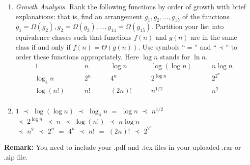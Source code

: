 \documentclass[12pt,a4paper]{article}
\makeatletter
\newtheorem*{solution}{Solution}
\theoremstyle{definition}
\renewenvironment{solution}[1][Solution] {\par\pushQED{\qed}\normalfont\topsep6\p@\@plus6\p@\relax\trivlist\item[\hskip\labelsep\bfseries#1\@addpunct{.}]\ignorespaces}{\popQED\endtrivlist\@endpefalse} \makeatother
\makeatother
\begin{document}
\begin{enumerate}
\item \textit{Growth Analysis.} Rank the following functions by order of growth with brief explanations: that is, find an arrangement $g_1, g_2, \ldots , g_{15}$ of the functions $g_1 = \Omega(g_2), g_2 = \Omega(g_3), \ldots, g_{14} = \Omega(g_{15})$.  Partition your list into equivalence classes such that functions $f(n)$ and $g(n)$ are in the same class if and only if $f(n) = \Theta(g(n))$. Use symbols ``$=$'' and ``$\prec$'' to order these functions appropriately. Here $\log n$ stands for $\ln n$.
$$
\begin{array}{ccccc}
	1 \quad & \quad n \quad & \quad \log n \quad & \quad \log (\log n) \quad & \quad n \log n \\
	\log_4 n \quad & \quad 2^n \quad & \quad 4^n \quad & \quad 2^{\log n} \quad & \quad 2^{2^n} \\
	\log (n!) \quad & \quad n! \quad & \quad (2n)! \quad & \quad  n^{1/2} \quad & \quad n^2 \\
\end{array}
$$
    \begin{solution}
		$1$ $\prec$ $\log (\log n)$ $\prec$ $\log_4 n$ $=$ $\log n$ $\prec$ $n^{1/2}$ \\
		$\prec$ $2^{\log n}$ $\prec$ $n$ $\prec$ $\log (n!)$ $\prec$ $n \log n$ \\
		$\prec$ $n^2$ $\prec$ $2^n$ $=$ $4^n$ $\prec$ $n!$ $=$ $(2n)!$ $\prec$ $2^{2^n}$ \\
    \end{solution}


\end{enumerate}

\vspace{20pt}

\textbf{Remark:} You need to include your .pdf and .tex files in your uploaded .rar or .zip file.

\end{document}
